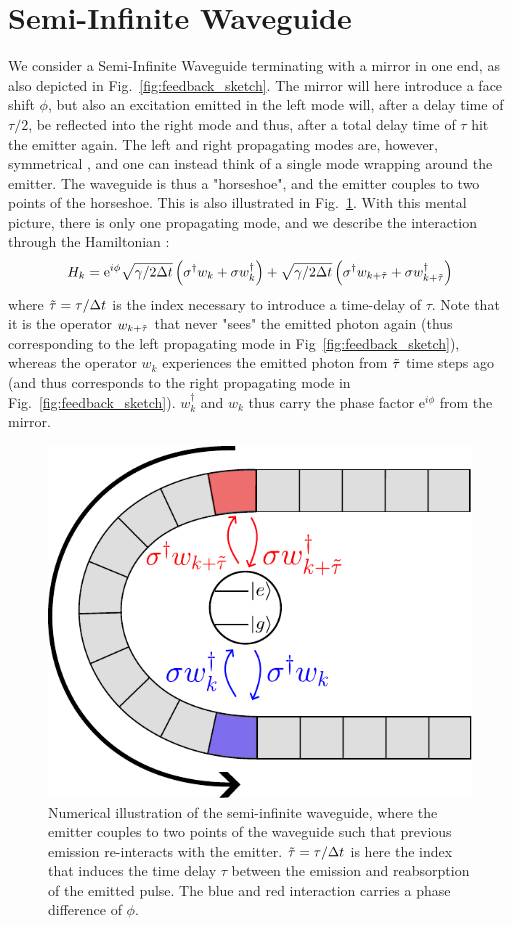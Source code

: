 \section{Semi-Infinite Waveguide}
We consider a Semi-Infinite Waveguide terminating with a mirror in one end, as also depicted in Fig.~\ref{fig:feedback_sketch}. The mirror will here introduce a face shift $\phi$, but also an excitation emitted in the left mode will, after a delay time of $\tau/2$, be reflected into the right mode and thus, after a total delay time of $\tau$ hit the emitter again. The left and right propagating modes are, however, symmetrical \cite{ArranzRegidor2021ModelingModel}, and one can instead think of a single mode wrapping around the emitter. The waveguide is thus a "horseshoe", and the emitter couples to two points of the horseshoe. This is also illustrated in Fig.~\ref{fig:horseshoe}. With this mental picture, there is only one propagating mode, and we describe the interaction through the Hamiltonian \cite{Whalen2019CollisionTrajectories}:
\begin{equation}
    H_k = \mathrm{e}^{i \phi} \sqrt{\gamma/2\Delta t} \left( \sigma^\dagger w_{k} + \sigma w_{k}^\dagger \right) + \sqrt{\gamma/2\Delta t} \left( \sigma^\dagger w_{k+\Tilde{\tau}} + \sigma w_{k+\Tilde{\tau}}^\dagger \right) \label{eq:tls_feedback}
\end{equation}
where $\Tilde{\tau} = \tau/\Delta t$ is the index necessary to introduce a time-delay of $\tau$. Note that it is the operator $w_{k+\Tilde{\tau}}$ that never "sees" the emitted photon again (thus corresponding to the left propagating mode in Fig~\ref{fig:feedback_sketch}), whereas the operator $w_{k}$ experiences the emitted photon from $\Tilde{\tau}$ time steps ago (and thus corresponds to the right propagating mode in Fig.~\ref{fig:feedback_sketch}).  $w_{k}^\dagger$ and $w_{k}$ thus carry the phase factor $\mathrm{e}^{i \phi}$ from the mirror. 

\begin{figure}[H]
    \centering
    \includegraphics[width=0.5\linewidth]{figures/horseshoe.pdf}
    \caption{Numerical illustration of the semi-infinite waveguide, where the emitter couples to two points of the waveguide such that previous emission re-interacts with the emitter. $\Tilde{\tau} = \tau/\Delta t$ is here the index that induces the time delay $\tau$ between the emission and reabsorption of the emitted pulse. The blue and red interaction carries a phase difference of $\phi$.}
    \label{fig:horseshoe}
\end{figure}

